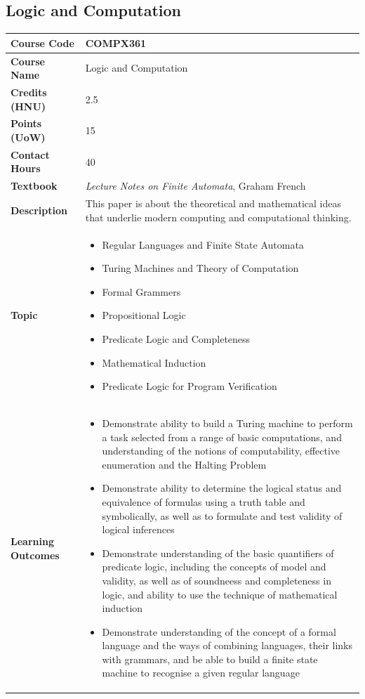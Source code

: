 \documentclass{article}
\begin{document}
\subsection[COMPX361 Logic and Computation]{Logic and Computation}
\renewcommand{\arraystretch}{1.5} %
\begin{longtable}{|p{3cm}|p{10cm}|}
\hline
\textbf{Course Code} & COMPX361 \\
\hline
\textbf{Course Name} & Logic and Computation \\
\hline
\textbf{Credits (HNU)} & 2.5 \\
\hline
\textbf{Points (UoW)} & 15 \\
\hline
\textbf{Contact Hours} & 40 \\
\hline
\textbf{Textbook} & \emph{Lecture Notes on Finite Automata}, Graham French\\
\hline
\textbf{Description} & This paper is about the theoretical and mathematical ideas that underlie modern computing and computational thinking. \\
\hline
\textbf{Topic} & \begin{itemize}
    \item Regular Languages and Finite State Automata
    \item Turing Machines and Theory of Computation
    \item Formal Grammers
    \item Propositional Logic
    \item Predicate Logic and Completeness
    \item Mathematical Induction
    \item Predicate Logic for Program Verification
\end{itemize} \\
\hline
\textbf{Learning Outcomes} & 
    \begin{itemize}
        \item Demonstrate ability to build a Turing machine to perform a task selected from a range of basic computations, and understanding of the notions of computability, effective enumeration and the Halting Problem
        \item Demonstrate ability to determine the logical status and equivalence of formulas using a truth table and symbolically, as well as to formulate and test validity of logical inferences
        \item Demonstrate understanding of the basic quantifiers of predicate logic, including the concepts of model and validity, as well as of soundneess and completeness in logic, and ability to use the technique of mathematical induction
        \item Demonstrate understanding of the concept of a formal language and the ways of combining languages, their links with grammars, and be able to build a finite state machine to recognise a given regular language
    \end{itemize} \\
\hline
\end{longtable}
\end{document}
